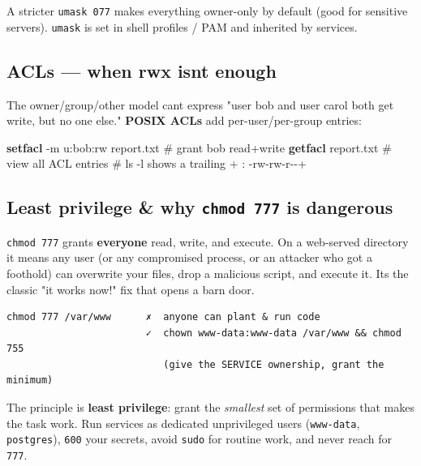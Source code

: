 \documentclass[11pt]{article}
\newenvironment{Shaded}{\begin{snugshade}}{\end{snugshade}}
\newcommand{\AttributeTok}[1]{\textcolor[rgb]{0.16,0.50,0.73}{#1}}
\newcommand{\CommentTok}[1]{\textcolor[rgb]{0.48,0.49,0.49}{#1}}
\newcommand{\ExtensionTok}[1]{\textcolor[rgb]{0.00,0.60,1.00}{\textbf{#1}}}
\newcommand{\NormalTok}[1]{\textcolor[rgb]{0.81,0.81,0.76}{#1}}
\begin{document}
A stricter \texttt{umask\ 077} makes everything owner-only by default (good for sensitive servers). \texttt{umask} is set in shell profiles / PAM and inherited by services.

\subsection{ACLs --- when rwx isn\textquotesingle t enough}\label{acls--when-rwx-isnt-enough}

The owner/group/other model can\textquotesingle t express "user bob and user carol both get write, but no one else." \textbf{POSIX ACLs} add per-user/per-group entries:


\begin{Shaded}
\begin{Highlighting}[]
\ExtensionTok{setfacl} \AttributeTok{{-}m}\NormalTok{ u:bob:rw  report.txt    }\CommentTok{\# grant bob read+write}
\ExtensionTok{getfacl}\NormalTok{ report.txt                 }\CommentTok{\# view all ACL entries}
\CommentTok{\# ls {-}l shows a trailing \textquotesingle{}+\textquotesingle{} :  {-}rw{-}rw{-}r{-}{-}+}
\end{Highlighting}
\end{Shaded}

\subsection{\texorpdfstring{Least privilege \& why \texttt{chmod\ 777} is dangerous}{Least privilege \& why chmod 777 is dangerous}}\label{least-privilege--why-chmod-777-is-dangerous}

\texttt{chmod\ 777} grants \textbf{everyone} read, write, and execute. On a web-served directory it means any user (or any compromised process, or an attacker who got a foothold) can overwrite your files, drop a malicious script, and execute it. It\textquotesingle s the classic "it works now!" fix that opens a barn door.

\setcodelang{}

\begin{verbatim}
chmod 777 /var/www      ✗  anyone can plant & run code
                        ✓  chown www-data:www-data /var/www && chmod 755
                           (give the SERVICE ownership, grant the minimum)
\end{verbatim}

The principle is \textbf{least privilege}: grant the \emph{smallest} set of permissions that makes the task work. Run services as dedicated unprivileged users (\texttt{www-data}, \texttt{postgres}), \texttt{600} your secrets, avoid \texttt{sudo} for routine work, and never reach for \texttt{777}.
\end{document}
